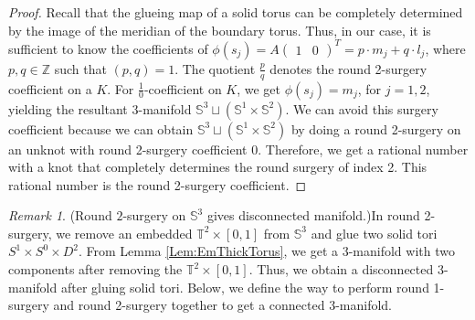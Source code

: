 \documentclass{amsart}
\theoremstyle{plain}
\theoremstyle{remark}
\newtheorem{rem}{Remark}
\theoremstyle{definition}
\newcommand{\s}{\mathbb{S}}
\newcommand{\D}{\mathbb{D}}
\begin{document}
\begin{proof}
Recall that the glueing map of a solid torus can be completely determined by the image of the meridian of the boundary torus. 
Thus, in our case, it is sufficient to know the coefficients of $\phi(s_j) = A \begin{pmatrix}
    1 & 0
\end{pmatrix}^T =p \cdot m_j + q \cdot l_j$, where $p, q \in \mathbb{Z}$ such that $(p,q)=1$. 
The quotient $\frac{p}{q}$ denotes the round 2-surgery coefficient on a $K$. For $\frac{1}{0}$-coefficient on $K$, we get $\phi(s_j)= m_j$, for $j=1,2$, yielding the resultant 3-manifold $\mathbb{S}^3 \sqcup (\s^1 \times \s^2)$. 
We can avoid this surgery coefficient because we can obtain $\mathbb{S}^3 \sqcup (\s^1 \times \s^2)$ by doing a round 2-surgery on an unknot with round 2-surgery coefficient ${0}$. 
Therefore, we get a rational number with a knot that completely determines the round surgery of index 2. 
This rational number is the {round 2-surgery coefficient}. \end{proof}



\begin{rem}{(Round $2$-surgery on $\mathbb{S}^3$ gives disconnected manifold.)}\label{rem: R2GivesDisconnected} 
In round 2-surgery, we remove an embedded $\mathbb{T}^2\times [0,1]$ from $\mathbb{S}^3$ and glue two solid tori $S^1 \times S^0 \times D^2$. From Lemma \ref{Lem:EmThickTorus}, we get a 3-manifold with two components after removing the $\mathbb{T}^2 \times [0,1]$. Thus, we obtain a disconnected 3-manifold after gluing solid tori. Below, we define the way to perform round 1-surgery and round 2-surgery together to get a connected 3-manifold. 
\end{rem}
\end{document}

